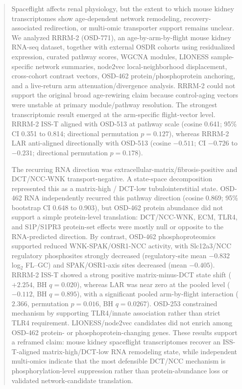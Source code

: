 \documentclass[11pt]{article}
\begin{document}
\vspace{0.8em}

\begin{abstract}
\noindent
Spaceflight affects renal physiology, but the extent to which mouse kidney transcriptomes show age-dependent network remodeling, recovery-associated redirection, or multi-omic transporter support remains unclear. We analyzed RRRM-2 (OSD-771), an age-by-arm-by-flight mouse kidney RNA-seq dataset, together with external OSDR cohorts using residualized expression, curated pathway scores, WGCNA modules, LIONESS sample-specific network summaries, node2vec local-neighborhood displacement, cross-cohort contrast vectors, OSD-462 protein/phosphoprotein anchoring, and a live-return arm attenuation/divergence analysis. RRRM-2 could not support the original broad age-rewiring claim because control-aging vectors were unstable at primary module/pathway resolution. The strongest transcriptomic result emerged at the arm-specific flight-vector level. RRRM-2 ISS-T aligned with OSD-513 at pathway scale (cosine 0.641; 95\% CI 0.351 to 0.814; directional permutation $p=0.127$), whereas RRRM-2 LAR anti-aligned directionally with OSD-513 (cosine $-0.511$; CI $-0.726$ to $-0.231$; directional permutation $p=0.178$).

The recurring RNA direction was extracellular-matrix/fibrosis-positive and DCT/NCC-WNK transport-negative. A state-space decomposition represented this as a matrix-high / DCT-low tubulointerstitial state. OSD-462 RNA independently recurred this pathway direction (cosine 0.869; 95\% bootstrap CI 0.648 to 0.903), but OSD-462 protein abundance did not support a simple protein-level translation: DCT/NCC-WNK, ECM, TLR4, and S1P/S1PR3 protein-set effects were mostly null or opposite to the RNA-predicted direction. By contrast, OSD-462 phosphoproteomics supported reduced WNK-SPAK/OSR1-NCC activity, with Slc12a3/NCC regulatory phosphosites strongly decreased (regulatory-site mean $-0.832$ log$_2$ FL--GC) and SPAK/OSR1-axis sites decreased (mean $-0.405$). RRRM-2 ISS-T showed a strong positive matrix-minus-DCT state shift ($+2.254$, BH $q=0.020$), whereas LAR was near zero at the pooled level ($-0.112$, BH $q=0.895$), with a significant pooled arm-by-flight interaction ($2.366$, permutation $p=0.016$, BH $q=0.0267$). OSD-253 constrained mechanism by supporting TLR4/innate association rather than strict TLR4 requirement. LIONESS/node2vec candidates did not enrich among OSD-462 protein- or phosphoprotein-changing genes. These results support a reframed claim: mouse kidney spaceflight transcriptomes recover an ISS-T-aligned matrix-high/DCT-low RNA remodeling state, while independent multi-omics indicate that the most defensible DCT/NCC mechanism is phosphorylation-level suppression rather than protein-abundance loss or validated network-candidate translation.
\end{abstract}
\end{document}
